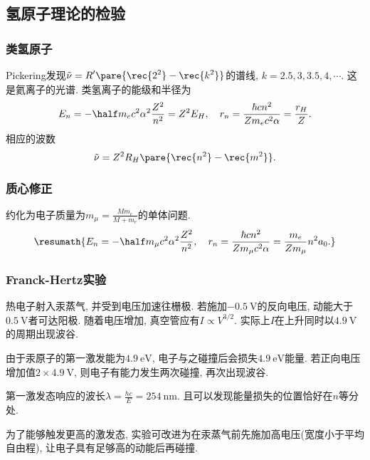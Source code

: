 \documentclass[hidelinks]{ctexart}
\begin{document}

\subsection{氢原子理论的检验} %
\label{sub:氢原子理论的检验}

\subsubsection{类氢原子} %
\label{ssub:类氢原子}

Pickering发现$\displaystyle \tilde{\nu} = R'\pare{\rec{2^2} - \rec{k^2}}$的谱线, $k = 2.5, 3, 3.5, 4, \cdots$. 这是氦离子的光谱. 类氢离子的能级和半径为
\[ E_n = -\half m_ec^2 \alpha^2 \frac{Z^2}{n^2} = Z^2E_H,\quad r_n = \frac{\hbar cn^2}{Zm_ec^2\alpha} = \frac{r_H}{Z}. \]
相应的波数
\[ \tilde{\nu} = Z^2 R_H \pare{\rec{n^2} - \rec{m^2}}. \]


\subsubsection{质心修正} %
\label{ssub:质心修正}

约化为电子质量为$\displaystyle m_\mu = \frac{Mm_e}{M+m_e}$的单体问题.
\[ \resumath{E_n = -\half m_\mu c^2 \alpha^2 \frac{Z^2}{n^2},\quad r_n = \frac{\hbar cn^2}{Zm_\mu c^2\alpha} = \frac{m_e}{Zm_\mu}n^2a_0.} \]


\subsubsection{Franck-Hertz实验} %
\label{ssub:franck_hertz实验}

热电子射入汞蒸气, 并受到电压加速往栅极. 若施加$-\SI{0.5}{\volt}$的反向电压, 动能大于$\SI{0.5}{\volt}$者可达阳极. 随着电压增加, 真空管应有$I\propto V^{3/2}$. 实际上$I$在上升同时以$\SI{4.9}{\volt}$的周期出现波谷.
\par
由于汞原子的第一激发能为$\SI{4.9}{\eV}$, 电子与之碰撞后会损失$\SI{4.9}{\eV}$能量. 若正向电压增加值$2\times \SI{4.9}{\volt}$, 则电子有能力发生两次碰撞, 再次出现波谷.
\par
第一激发态响应的波长$\displaystyle \lambda = \frac{hc}{E} = \SI{254}{\nano\meter}$. 且可以发现能量损失的位置恰好在$n$等分处.
\par
为了能够触发更高的激发态, 实验可改进为在汞蒸气前先施加高电压(宽度小于平均自由程), 让电子具有足够高的动能后再碰撞.
\end{document}
